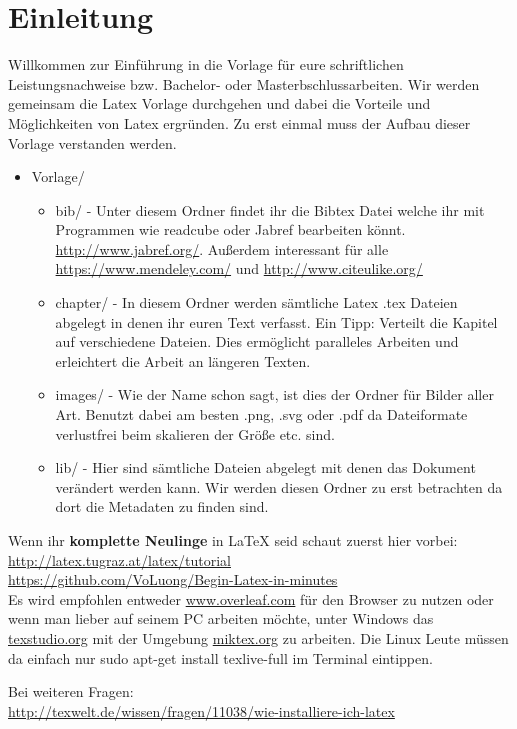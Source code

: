 \chapter{Einleitung}
Willkommen zur Einführung in die Vorlage für eure schriftlichen Leistungsnachweise bzw. Bachelor- oder Masterbschlussarbeiten. Wir werden gemeinsam die Latex Vorlage durchgehen und dabei die Vorteile und Möglichkeiten von Latex ergründen. Zu erst einmal muss der Aufbau dieser Vorlage verstanden werden.

\begin{itemize}
	\item Vorlage/
		\begin{itemize}
			\item bib/ - Unter diesem Ordner findet ihr die Bibtex Datei welche ihr mit Programmen wie readcube oder Jabref bearbeiten könnt. \url{http://www.jabref.org/}. Außerdem interessant für alle \url{https://www.mendeley.com/} und \url{http://www.citeulike.org/}
			\item chapter/ - In diesem Ordner werden sämtliche Latex .tex Dateien abgelegt in denen ihr euren Text verfasst. Ein Tipp: Verteilt die Kapitel auf verschiedene Dateien. Dies ermöglicht paralleles Arbeiten und erleichtert die Arbeit an längeren Texten.
			\item images/ - Wie der Name schon sagt, ist dies der Ordner für Bilder aller Art. Benutzt dabei am besten .png, .svg oder .pdf da Dateiformate verlustfrei beim skalieren der Größe etc. sind.
			\item lib/ - Hier sind sämtliche Dateien abgelegt mit denen das Dokument verändert werden kann. Wir werden diesen Ordner zu erst betrachten da dort die Metadaten zu finden sind. 
		\end{itemize}
\end{itemize}

Wenn ihr \textbf{komplette Neulinge} in LaTeX seid schaut zuerst hier vorbei: \\\url{http://latex.tugraz.at/latex/tutorial}\\
\url{https://github.com/VoLuong/Begin-Latex-in-minutes}\\

Es wird empfohlen entweder \url{www.overleaf.com} für den Browser zu nutzen oder wenn man lieber auf seinem PC arbeiten möchte, unter Windows das \url{texstudio.org} mit der Umgebung \url{miktex.org} zu arbeiten. Die Linux Leute müssen da einfach nur sudo apt-get install texlive-full im Terminal eintippen. 

Bei weiteren Fragen:\\
\url{http://texwelt.de/wissen/fragen/11038/wie-installiere-ich-latex}

